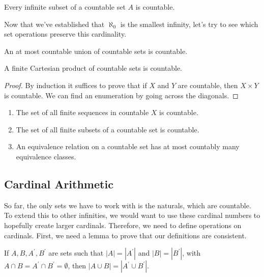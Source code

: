   \begin{theorem}
    \label{countable smallest}
    Every infinite subset of a countable set $A$ is countable. 
  \end{theorem} 

  Now that we've established that $\aleph_0$ is the smallest infinity, let's try to see which set operations preserve this cardinality. 

  \begin{theorem}
    An at most countable union of countable sets is countable. 
  \end{theorem}

  \begin{theorem}
    A finite Cartesian product of countable sets is countable. 
  \end{theorem}
  \begin{proof}
    By induction it suffices to prove that if $X$ and $Y$ are countable, then $X \times Y$ is countable. We can find an enumeration by going across the diagonals. 
  \end{proof} 

  \begin{theorem} 
    \begin{enumerate}
      \item The set of all finite sequences in countable $X$ is countable. 
      \item The set of all finite subsets of a countable set is countable. 
      \item An equivalence relation on a countable set has at most countably many equivalence classes. 
    \end{enumerate}
  \end{theorem} 

\subsection{Cardinal Arithmetic} 

  So far, the only sets we have to work with is the naturals, which are countable. To extend this to other infinities, we would want to use these cardinal numbers to hopefully create larger cardinals. Therefore, we need to define operations on cardinals. First, we need a lemma to prove that our definitions are consistent. 

  \begin{lemma} 
    If $A, B, A^\prime, B^\prime$ are sets such that $|A| = |A^\prime|$ and $|B| = |B^\prime|$, with $A \cap B = A^\prime \cap B^\prime = \emptyset$, then $|A \cup B| = |A^\prime \cup B^\prime|$. 
  \end{lemma}

